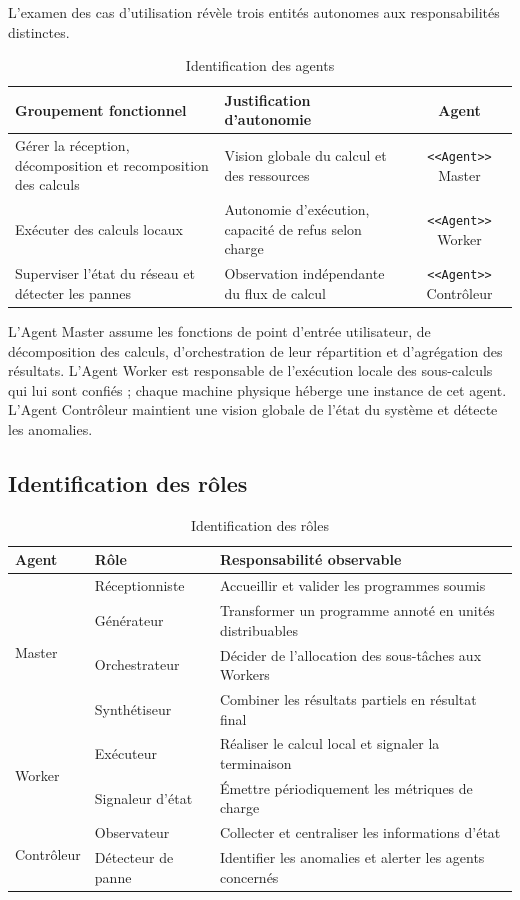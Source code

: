 \documentclass[12pt,a4paper]{report}
\begin{document}
L'examen des cas d'utilisation révèle trois entités autonomes aux responsabilités distinctes.

\begin{table}[H]
\centering
\renewcommand{\arraystretch}{1.3}
\begin{tabular}{|p{4.5cm}|p{5.5cm}|c|}
\hline
\textbf{Groupement fonctionnel} & \textbf{Justification d'autonomie} & \textbf{Agent} \\
\hline
Gérer la réception, décomposition et recomposition des calculs & Vision globale du calcul et des ressources & \texttt{<<Agent>>} Master \\
\hline
Exécuter des calculs locaux & Autonomie d'exécution, capacité de refus selon charge & \texttt{<<Agent>>} Worker \\
\hline
Superviser l'état du réseau et détecter les pannes & Observation indépendante du flux de calcul & \texttt{<<Agent>>} Contrôleur \\
\hline
\end{tabular}
\caption{Identification des agents}
\label{tab:identification_agents}
\end{table}

L'Agent Master assume les fonctions de point d'entrée utilisateur, de décomposition des calculs, d'orchestration de leur répartition et d'agrégation des résultats. L'Agent Worker est responsable de l'exécution locale des sous-calculs qui lui sont confiés ; chaque machine physique héberge une instance de cet agent. L'Agent Contrôleur maintient une vision globale de l'état du système et détecte les anomalies.

\subsection{Identification des rôles}

\begin{table}[H]
\centering
\renewcommand{\arraystretch}{1.3}
\begin{tabular}{|l|l|l|}
\hline
\textbf{Agent} & \textbf{Rôle} & \textbf{Responsabilité observable} \\
\hline
\multirow{4}{*}{Master} & Réceptionniste & Accueillir et valider les programmes soumis \\
 & Générateur & Transformer un programme annoté en unités distribuables \\
 & Orchestrateur & Décider de l'allocation des sous-tâches aux Workers \\
 & Synthétiseur & Combiner les résultats partiels en résultat final \\
\hline
\multirow{2}{*}{Worker} & Exécuteur & Réaliser le calcul local et signaler la terminaison \\
 & Signaleur d'état & Émettre périodiquement les métriques de charge \\
\hline
\multirow{2}{*}{Contrôleur} & Observateur & Collecter et centraliser les informations d'état \\
 & Détecteur de panne & Identifier les anomalies et alerter les agents concernés \\
\hline
\end{tabular}
\caption{Identification des rôles}
\label{tab:identification_roles}
\end{table}
\end{document}
